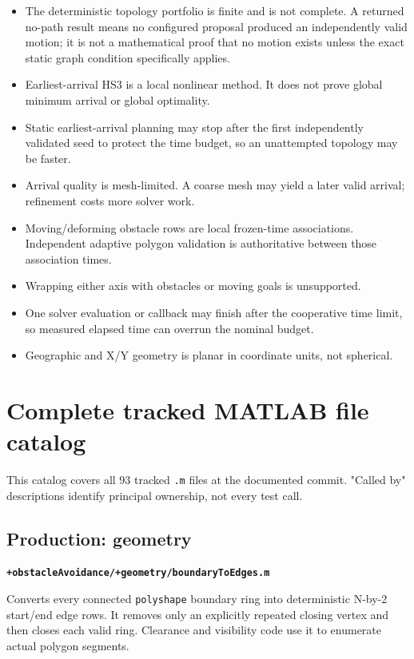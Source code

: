 \documentclass[10pt,letterpaper]{article}
\newcommand{\file}[1]{\nolinkurl{#1}}
\newcommand{\scriptentry}[2]{%
  \par\medskip\noindent\textbf{\file{#1}}\par
  \begingroup\raggedright #2\par\endgroup
}
\begin{document}
\begin{itemize}
  \item The deterministic topology portfolio is finite and is not complete.
  A returned no-path result means no configured proposal produced an
  independently valid motion; it is not a mathematical proof that no motion
  exists unless the exact static graph condition specifically applies.
  \item Earliest-arrival HS3 is a local nonlinear method. It does not prove
  global minimum arrival or global optimality.
  \item Static earliest-arrival planning may stop after the first independently
  validated seed to protect the time budget, so an unattempted topology may be
  faster.
  \item Arrival quality is mesh-limited. A coarse mesh may yield a later valid
  arrival; refinement costs more solver work.
  \item Moving/deforming obstacle rows are local frozen-time associations.
  Independent adaptive polygon validation is authoritative between those
  association times.
  \item Wrapping either axis with obstacles or moving goals is unsupported.
  \item One solver evaluation or callback may finish after the cooperative
  time limit, so measured elapsed time can overrun the nominal budget.
  \item Geographic and X/Y geometry is planar in coordinate units, not spherical.
\end{itemize}

\section{Complete tracked MATLAB file catalog}\label{sec:inventory}

This catalog covers all 93 tracked \file{.m} files at the documented commit.
"Called by" descriptions identify principal ownership, not every test call.

\subsection{Production: geometry}

\scriptentry{+obstacleAvoidance/+geometry/boundaryToEdges.m}{Converts every
connected \file{polyshape} boundary ring into deterministic N-by-2 start/end
edge rows. It removes only an explicitly repeated closing vertex and then
closes each valid ring. Clearance and visibility code use it to enumerate
actual polygon segments.}
\end{document}
